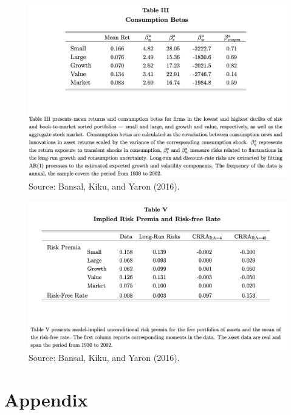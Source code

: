 \documentclass[
  12pt,
]{book}
\theoremstyle{definition}
\theoremstyle{definition}
\theoremstyle{definition}
\theoremstyle{definition}
\theoremstyle{remark}
\begin{document}
\begin{figure}

{\centering \includegraphics[width=1\linewidth]{figures/table_BKY1} 

}

\caption{Source: Bansal, Kiku, and Yaron (2016).}\label{fig:BKY1}
\end{figure}

\begin{figure}

{\centering \includegraphics[width=1\linewidth]{figures/table_BKY2} 

}

\caption{Source: Bansal, Kiku, and Yaron (2016).}\label{fig:BKY2}
\end{figure}

\hypertarget{appendix}{%
\section{Appendix}\label{appendix}}
\end{document}
